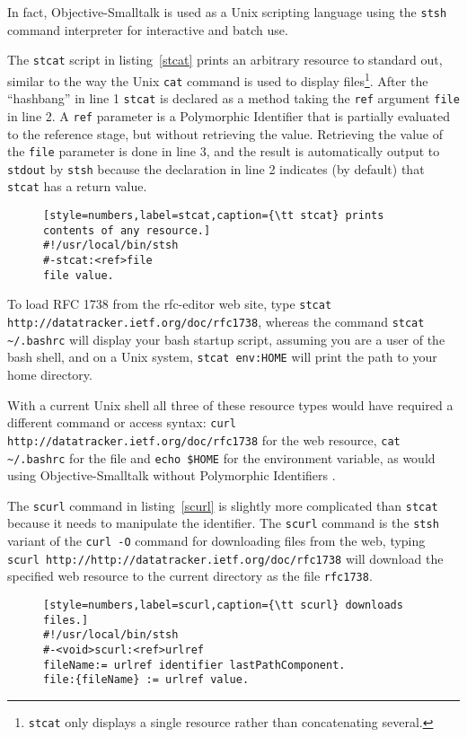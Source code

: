 \documentclass[preprint,authoryear]{llncs}
\begin{document}
In fact,  Objective-Smalltalk is used as a Unix scripting language using the {\tt stsh} command
interpreter for interactive and batch use.  

The {\tt stcat} script in listing~\ref{stcat} prints an arbitrary resource to standard out, 
similar to the way the Unix {\tt cat} command is used to display files\footnote{{\tt stcat} only 
displays a single resource rather than concatenating several.}.
After the ``hashbang'' in line 1 {\tt stcat} is declared as a method taking the {\tt ref} argument {\tt file} 
in line 2.
A {\tt ref} parameter is a Polymorphic Identifier that is partially evaluated to the reference stage,
but without retrieving the value.  Retrieving the value of the {\tt file} parameter is done in line 3,
and the result is automatically output to {\tt stdout} by {\tt stsh} because the declaration in line
2 indicates (by default) that {\tt stcat} has a return value.

\begin{figure}[htbp]
\begin{lstlisting}[style=numbers,label=stcat,caption={\tt stcat} prints contents of any resource.]
#!/usr/local/bin/stsh
#-stcat:<ref>file
file value.
\end{lstlisting}
\end{figure}

To load RFC 1738 from the rfc-editor web site, type  {\tt stcat http://datatracker.ietf.org/doc/rfc1738}, whereas 
the command {\tt stcat \~\//.bashrc} will display your bash startup script, assuming you are a user of the
bash shell, and on a Unix system, {\tt stcat env:HOME} will print the path to 
your home directory.

With a current Unix shell all three of these resource types would have required a different
command or access syntax:   {\tt curl http://datatracker.ietf.org/doc/rfc1738} for the
web resource, {\tt cat  \~\//.bashrc} for the file and {\tt echo \$HOME} for the environment
variable, as would using Objective-Smalltalk without Polymorphic Identifiers .

The {\tt scurl} command in listing~\ref{scurl} is slightly more complicated than {\tt stcat} because
it needs to manipulate the identifier.  The {\tt scurl} command
is the {\tt stsh} variant of the {\tt curl -O} command for downloading files from the web, typing
{\tt scurl http://http://datatracker.ietf.org/doc/rfc1738} will download the specified web resource
to the current directory as the file {\tt rfc1738}.

\begin{figure}[htbp]
\begin{lstlisting}[style=numbers,label=scurl,caption={\tt scurl} downloads files.]
#!/usr/local/bin/stsh
#-<void>scurl:<ref>urlref
fileName:= urlref identifier lastPathComponent.
file:{fileName} := urlref value.
\end{lstlisting}
\end{figure}
\end{document}

